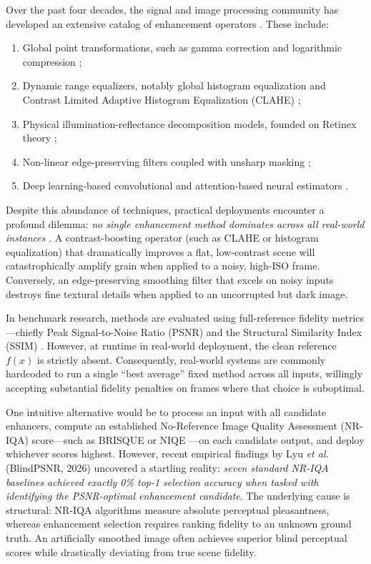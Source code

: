 \documentclass[journal]{IEEEtran}
\begin{document}
Over the past four decades, the signal and image processing community has developed an extensive catalog of enhancement operators \cite{zheng2024lowlight}. These include:
\begin{enumerate}
    \item Global point transformations, such as gamma correction and logarithmic compression \cite{bradski2000opencv};
    \item Dynamic range equalizers, notably global histogram equalization and Contrast Limited Adaptive Histogram Equalization (CLAHE) \cite{zuiderveld1994contrast};
    \item Physical illumination-reflectance decomposition models, founded on Retinex theory \cite{land1971lightness, jobson1997multiscale};
    \item Non-linear edge-preserving filters coupled with unsharp masking \cite{tomasi1998bilateral, buades2005nonlocal};
    \item Deep learning-based convolutional and attention-based neural estimators \cite{wei2018deep, guo2020zero}.
\end{enumerate}

Despite this abundance of techniques, practical deployments encounter a profound dilemma: \textit{no single enhancement method dominates across all real-world instances} \cite{wolpert1997no}. A contrast-boosting operator (such as CLAHE or histogram equalization) that dramatically improves a flat, low-contrast scene will catastrophically amplify grain when applied to a noisy, high-ISO frame. Conversely, an edge-preserving smoothing filter that excels on noisy inputs destroys fine textural details when applied to an uncorrupted but dark image.

In benchmark research, methods are evaluated using full-reference fidelity metrics—chiefly Peak Signal-to-Noise Ratio (PSNR) and the Structural Similarity Index (SSIM) \cite{wang2004image, hore2010image}. However, at runtime in real-world deployment, the clean reference $f(x)$ is strictly absent. Consequently, real-world systems are commonly hardcoded to run a single ``best average'' fixed method across all inputs, willingly accepting substantial fidelity penalties on frames where that choice is suboptimal.

One intuitive alternative would be to process an input with all candidate enhancers, compute an established No-Reference Image Quality Assessment (NR-IQA) score—such as BRISQUE \cite{mittal2012no} or NIQE \cite{mittal2013making}—on each candidate output, and deploy whichever scores highest. However, recent empirical findings by Lyu \textit{et al.} (BlindPSNR, 2026) \cite{lyu2026blindpsnr} uncovered a startling reality: \textit{seven standard NR-IQA baselines achieved exactly 0\% top-1 selection accuracy when tasked with identifying the PSNR-optimal enhancement candidate}. The underlying cause is structural: NR-IQA algorithms measure absolute perceptual pleasantness, whereas enhancement selection requires ranking fidelity to an unknown ground truth. An artificially smoothed image often achieves superior blind perceptual scores while drastically deviating from true scene fidelity.
\end{document}
